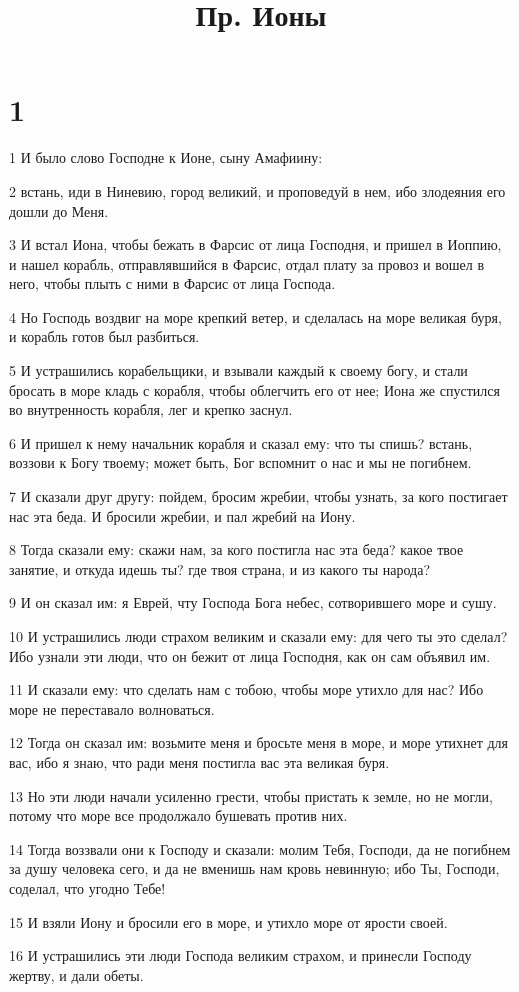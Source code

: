 

\title{Пр. Ионы}


\chapter{1}

\par 1 И было слово Господне к Ионе, сыну Амафиину:
\par 2 встань, иди в Ниневию, город великий, и проповедуй в нем, ибо злодеяния его дошли до Меня.
\par 3 И встал Иона, чтобы бежать в Фарсис от лица Господня, и пришел в Иоппию, и нашел корабль, отправлявшийся в Фарсис, отдал плату за провоз и вошел в него, чтобы плыть с ними в Фарсис от лица Господа.
\par 4 Но Господь воздвиг на море крепкий ветер, и сделалась на море великая буря, и корабль готов был разбиться.
\par 5 И устрашились корабельщики, и взывали каждый к своему богу, и стали бросать в море кладь с корабля, чтобы облегчить его от нее; Иона же спустился во внутренность корабля, лег и крепко заснул.
\par 6 И пришел к нему начальник корабля и сказал ему: что ты спишь? встань, воззови к Богу твоему; может быть, Бог вспомнит о нас и мы не погибнем.
\par 7 И сказали друг другу: пойдем, бросим жребии, чтобы узнать, за кого постигает нас эта беда. И бросили жребии, и пал жребий на Иону.
\par 8 Тогда сказали ему: скажи нам, за кого постигла нас эта беда? какое твое занятие, и откуда идешь ты? где твоя страна, и из какого ты народа?
\par 9 И он сказал им: я Еврей, чту Господа Бога небес, сотворившего море и сушу.
\par 10 И устрашились люди страхом великим и сказали ему: для чего ты это сделал? Ибо узнали эти люди, что он бежит от лица Господня, как он сам объявил им.
\par 11 И сказали ему: что сделать нам с тобою, чтобы море утихло для нас? Ибо море не переставало волноваться.
\par 12 Тогда он сказал им: возьмите меня и бросьте меня в море, и море утихнет для вас, ибо я знаю, что ради меня постигла вас эта великая буря.
\par 13 Но эти люди начали усиленно грести, чтобы пристать к земле, но не могли, потому что море все продолжало бушевать против них.
\par 14 Тогда воззвали они к Господу и сказали: молим Тебя, Господи, да не погибнем за душу человека сего, и да не вменишь нам кровь невинную; ибо Ты, Господи, соделал, что угодно Тебе!
\par 15 И взяли Иону и бросили его в море, и утихло море от ярости своей.
\par 16 И устрашились эти люди Господа великим страхом, и принесли Господу жертву, и дали обеты.


